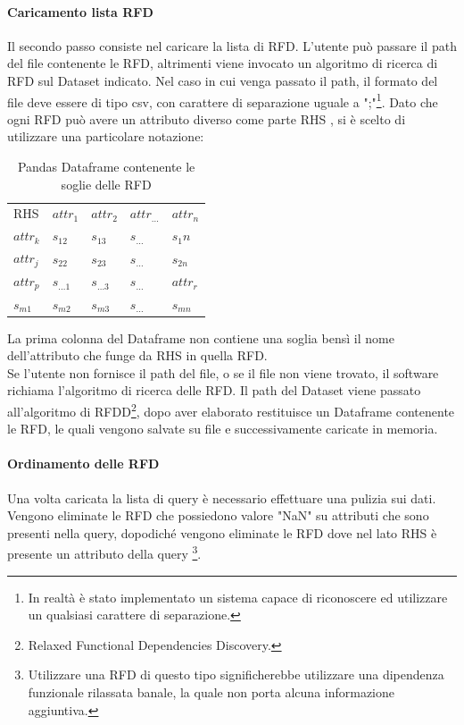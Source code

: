 \paragraph{Caricamento lista RFD}
Il secondo passo consiste nel caricare la lista di RFD. L'utente può passare il path del file contenente le RFD, altrimenti viene invocato un algoritmo di ricerca di RFD sul Dataset indicato.
Nel caso in cui venga passato il path, il formato del file deve essere di tipo csv, con carattere di separazione uguale a ";"\footnote{In realtà è stato implementato un sistema capace di riconoscere ed utilizzare un qualsiasi carattere di separazione.}.
Dato che ogni RFD può avere un attributo diverso come parte RHS , si è scelto di utilizzare una particolare notazione:
\begin{table}[H]
    \centering
    \begin{tabular}{l l l l l }
     RHS & $attr_1$ & $attr_2$ & $attr_{\ldots}$ & $attr_n$ \\
    $attr_{k}$ & $s_{12}$ & $s_{13}$ & $s_{\ldots}$ & $s_1n$  \\
    $attr_{j}$ & $s_{22}$ & $s_{23}$  & $s_{\ldots}$ & $s_{2n}$\\
    $attr_{p}$ & $s_{\ldots1}$ & $s_{\ldots3}$  & $s_{\ldots}$ & $attr_{r}$\\
    $s_{m1}$ & $s_{m2}$ & $s_{m3}$ & $s_{\ldots}$ & $s_{mn}$\\
    \end{tabular}
    \caption{Pandas Dataframe contenente le soglie delle RFD}
    \label{tab:RFD_notation}
\end{table}

La prima colonna del Dataframe non contiene una soglia bensì il nome dell'attributo che funge da RHS in quella RFD.
\\
Se l'utente non fornisce il path del file, o se il file non viene trovato, il software richiama l'algoritmo di ricerca delle RFD. Il path del Dataset viene passato all'algoritmo di RFDD\footnote{Relaxed Functional Dependencies Discovery.}, dopo aver elaborato restituisce un Dataframe contenente le RFD, le quali vengono salvate su file e successivamente caricate in memoria.
\paragraph{Ordinamento delle RFD}
Una volta caricata la lista di query è necessario effettuare una pulizia sui dati.
Vengono eliminate le RFD che possiedono valore "NaN" su attributi che sono presenti nella query, dopodiché vengono eliminate le RFD dove nel lato RHS è presente un attributo della query \footnote{Utilizzare una RFD di questo tipo significherebbe utilizzare una dipendenza funzionale rilassata banale, la quale non porta alcuna informazione aggiuntiva.}.

